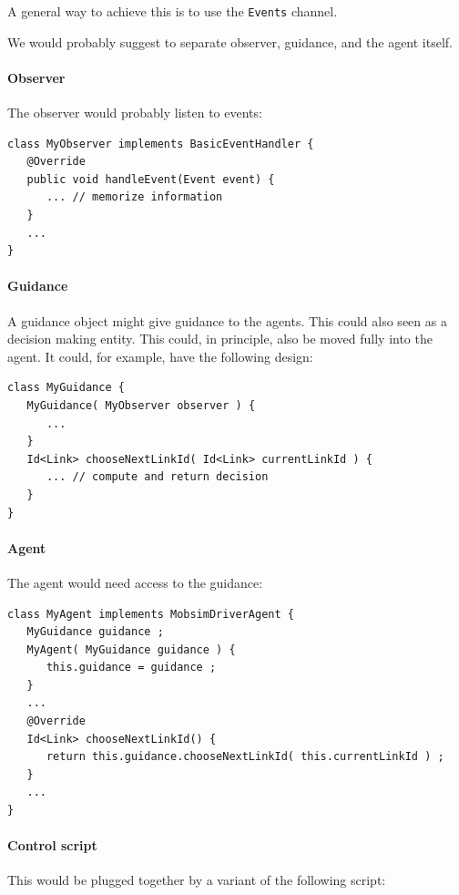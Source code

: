 A general way to achieve this is to use the \verb$Events$ channel.

We would probably suggest to separate observer, guidance, and the agent itself.

\paragraph{Observer}

The observer would probably listen to events:
\begin{lstlisting}
class MyObserver implements BasicEventHandler {
   @Override
   public void handleEvent(Event event) {
      ... // memorize information
   }
   ...
}
\end{lstlisting}

\paragraph{Guidance}

A guidance object might give guidance to the agents.  This could also seen as a decision making entity.  This could, in principle, also be moved fully into the agent.  It could, for example, have the following design:
\begin{lstlisting}
class MyGuidance {
   MyGuidance( MyObserver observer ) {
      ...
   }
   Id<Link> chooseNextLinkId( Id<Link> currentLinkId ) {
      ... // compute and return decision
   }
}
\end{lstlisting}

\paragraph{Agent}

The agent would need access to the guidance:
\begin{lstlisting}
class MyAgent implements MobsimDriverAgent {
   MyGuidance guidance ;
   MyAgent( MyGuidance guidance ) {
      this.guidance = guidance ;
   }  
   ...
   @Override
   Id<Link> chooseNextLinkId() {
      return this.guidance.chooseNextLinkId( this.currentLinkId ) ;
   }
   ...
}
\end{lstlisting}

\paragraph{Control script}

This would be plugged together by a variant of the following script:

